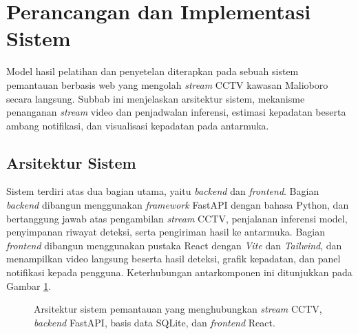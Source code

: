 \section{Perancangan dan Implementasi Sistem}
\label{sec:sistem}

Model hasil pelatihan dan penyetelan diterapkan pada sebuah sistem pemantauan berbasis web 
yang mengolah \textit{stream} CCTV kawasan Malioboro secara langsung. Subbab ini menjelaskan 
arsitektur sistem, mekanisme penanganan \textit{stream} video dan penjadwalan inferensi, estimasi 
kepadatan beserta ambang notifikasi, dan visualisasi kepadatan pada antarmuka.

\subsection{Arsitektur Sistem}

Sistem terdiri atas dua bagian utama, yaitu \textit{backend} dan \textit{frontend}. Bagian 
\textit{backend} dibangun menggunakan \textit{framework} FastAPI dengan bahasa Python, dan 
bertanggung jawab atas pengambilan \textit{stream} CCTV, penjalanan inferensi model, 
penyimpanan riwayat deteksi, serta pengiriman hasil ke antarmuka. Bagian \textit{frontend} 
dibangun menggunakan pustaka React dengan \textit{Vite} dan \textit{Tailwind}, dan 
menampilkan video langsung beserta hasil deteksi, grafik kepadatan, dan panel notifikasi 
kepada pengguna. Keterhubungan antarkomponen ini ditunjukkan pada Gambar 
\ref{fig:arsitektur_sistem}.

\begin{figure}[h]
    \centering
    \caption{Arsitektur sistem pemantauan yang menghubungkan \textit{stream} CCTV, \textit{backend} FastAPI, basis data SQLite, dan \textit{frontend} React.}
    \label{fig:arsitektur_sistem}
\end{figure}

